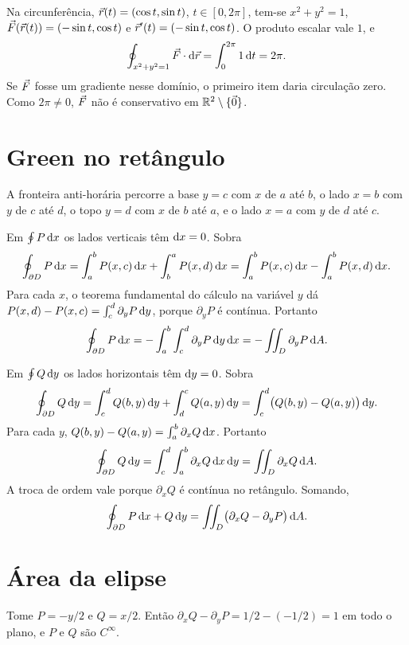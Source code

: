 \documentclass[11pt,a4paper]{article}
\begin{document}
Na circunferência, $\vec{r}(t)=(\cos t,\sin t)$, $t\in[0,2\pi]$, tem-se $x^2+y^2=1$, $\vec{F}(\vec{r}(t))=(-\sin t,\cos t)$ e $\vec{r}'(t)=(-\sin t,\cos t)$. O produto escalar vale $1$, e
\[
\oint_{x^2+y^2=1}\vec{F}\cdot\mathrm{d}\vec{r}=\int_0^{2\pi}1\,\mathrm{d} t=2\pi.
\]
Se $\vec{F}$ fosse um gradiente nesse domínio, o primeiro item daria circulação zero. Como $2\pi\neq 0$, $\vec{F}$ não é conservativo em $\mathbb{R}^2\setminus\{\vec{0}\}$.

\section{Green no retângulo}

A fronteira anti-horária percorre a base $y=c$ com $x$ de $a$ até $b$, o lado $x=b$ com $y$ de $c$ até $d$, o topo $y=d$ com $x$ de $b$ até $a$, e o lado $x=a$ com $y$ de $d$ até $c$.

Em $\oint P\,\mathrm{d} x$ os lados verticais têm $\mathrm{d} x=0$. Sobra
\[
\oint_{\partial D} P\,\mathrm{d} x
=\int_a^b P(x,c)\,\mathrm{d} x+\int_b^a P(x,d)\,\mathrm{d} x
=\int_a^b P(x,c)\,\mathrm{d} x-\int_a^b P(x,d)\,\mathrm{d} x.
\]
Para cada $x$, o teorema fundamental do cálculo na variável $y$ dá $P(x,d)-P(x,c)=\int_c^d\partial_y P\,\mathrm{d} y$, porque $\partial_y P$ é contínua. Portanto
\[
\oint_{\partial D} P\,\mathrm{d} x
=-\int_a^b\int_c^d\partial_y P\,\mathrm{d} y\,\mathrm{d} x
=-\iint_D\partial_y P\,\mathrm{d} A.
\]

Em $\oint Q\,\mathrm{d} y$ os lados horizontais têm $\mathrm{d} y=0$. Sobra
\[
\oint_{\partial D} Q\,\mathrm{d} y
=\int_c^d Q(b,y)\,\mathrm{d} y+\int_d^c Q(a,y)\,\mathrm{d} y
=\int_c^d\bigl(Q(b,y)-Q(a,y)\bigr)\,\mathrm{d} y.
\]
Para cada $y$, $Q(b,y)-Q(a,y)=\int_a^b\partial_x Q\,\mathrm{d} x$. Portanto
\[
\oint_{\partial D} Q\,\mathrm{d} y
=\int_c^d\int_a^b\partial_x Q\,\mathrm{d} x\,\mathrm{d} y
=\iint_D\partial_x Q\,\mathrm{d} A.
\]
A troca de ordem vale porque $\partial_x Q$ é contínua no retângulo. Somando,
\[
\oint_{\partial D} P\,\mathrm{d} x+Q\,\mathrm{d} y
=\iint_D\bigl(\partial_x Q-\partial_y P\bigr)\,\mathrm{d} A.
\]

\section{Área da elipse}

Tome $P=-y/2$ e $Q=x/2$. Então $\partial_x Q-\partial_y P=1/2-(-1/2)=1$ em todo o plano, e $P$ e $Q$ são $C^\infty$.
\end{document}
